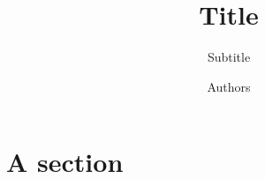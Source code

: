 \documentclass[a4paper, 11pt, parskip=half]{scrartcl}
\title{Title}
\subtitle{Subtitle}
\date{\vspace{-5ex}}
\author{Authors}
\theoremstyle{definition}
\begin{document}
\maketitle
{}



\section{A section}
\end{document}
